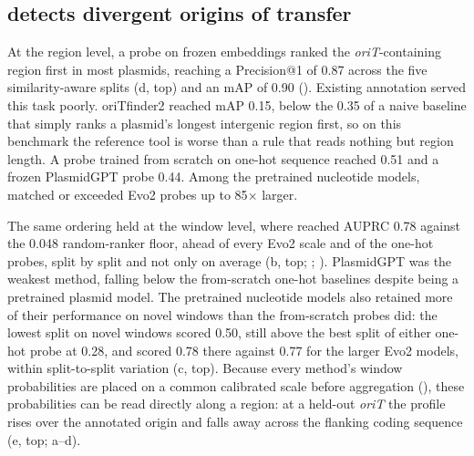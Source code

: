 \subsection*{\model detects divergent origins of transfer}
\label{sec:origin-orit}

At the region level, a probe on frozen \model embeddings ranked the
\emph{oriT}-containing region first in most plasmids, reaching a Precision@1
of 0.87 across the five similarity-aware splits (d, top) and
an mAP of 0.90 (). Existing annotation served this task
poorly. oriTfinder2 \cite{liu2025oritdb,li2018oritfinder} reached mAP 0.15, below the 0.35 of a naive baseline that simply ranks a
plasmid's longest intergenic region first, so on this benchmark the reference
tool is worse than a rule that reads nothing but region length. A probe
trained from scratch on one-hot sequence reached 0.51 and a frozen PlasmidGPT
\cite{shao2026plasmidgpt} probe 0.44. Among the pretrained nucleotide models, \model matched or exceeded
Evo2 \cite{brixi2026genome} probes up to 85$\times$ larger.

The same ordering held at the window level, where \model reached AUPRC 0.78
against the 0.048 random-ranker floor, ahead of every Evo2
scale and of the one-hot probes, split by split and not only on average
(b, top; ;
). PlasmidGPT was the weakest method, falling
below the from-scratch one-hot baselines despite being a pretrained plasmid
model. The pretrained nucleotide models also retained more of their
performance on novel windows than the from-scratch probes did: the lowest
\model split on novel windows scored 0.50, still above the best split of
either one-hot probe at 0.28, and \model scored 0.78 there against 0.77 for
the larger Evo2 models, within split-to-split variation
(c, top). Because every method's window probabilities are
placed on a common calibrated scale before aggregation
(), these probabilities can be read directly
along a region: at a held-out \emph{oriT} the profile rises over the annotated
origin and falls away across the flanking coding sequence
(e, top; a--d).


